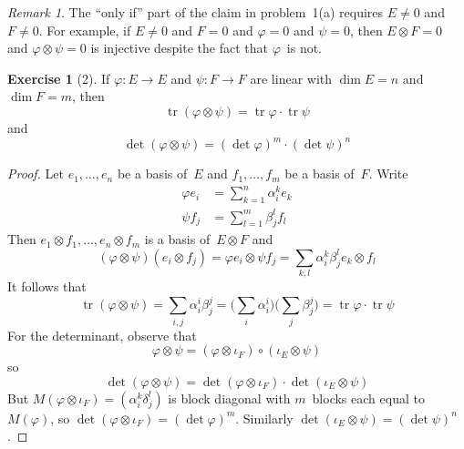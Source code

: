 \documentclass[letterpaper,12pt]{article}
\DeclareMathOperator{\tr}{tr}
\newcommand{\after}{\circ}
\newcommand{\mult}{\cdot}
\newcommand{\tprod}{\otimes}
\theoremstyle{definition}
\newtheorem*{exer}{Exercise}
\theoremstyle{remark}
\newtheorem*{rmk}{Remark}
\begin{document}
\begin{rmk}
The ``only if'' part of the claim in problem~1(a) requires \(E\ne 0\) and \(F\ne 0\). For example, if \(E\ne 0\) and \(F=0\) and \(\varphi=0\) and \(\psi=0\), then \(E\tprod F=0\) and \(\varphi\tprod\psi=0\) is injective despite the fact that \(\varphi\)~is not.
\end{rmk}

\begin{exer}[2]
If \(\varphi:E\to E\) and \(\psi:F\to F\) are linear with \(\dim E=n\) and \(\dim F=m\), then
\[\tr(\varphi\tprod\psi)=\tr\varphi\mult\tr\psi\]
and
\[\det(\varphi\tprod\psi)=(\det\varphi)^m\mult(\det\psi)^n\]
\end{exer}
\begin{proof}
Let \(e_1,\ldots,e_n\) be a basis of~\(E\) and \(f_1,\ldots,f_m\) be a basis of~\(F\). Write
\begin{align*}
\varphi e_i&=\sum_{k=1}^n\alpha^k_ie_k\\
\psi f_j&=\sum_{l=1}^m\beta^l_jf_l
\end{align*}
Then \(e_1\tprod f_1,\ldots,e_n\tprod f_m\) is a basis of~\(E\tprod F\) and
\[(\varphi\tprod\psi)(e_i\tprod f_j)=\varphi e_i\tprod\psi f_j=\sum_{k,l}\alpha^k_i\beta^l_je_k\tprod f_l\]
It follows that
\[\tr(\varphi\tprod\psi)=\sum_{i,j}\alpha^i_i\beta^j_j=\bigl(\sum_i\alpha^i_i\bigr)\bigl(\sum_j\beta^j_j\bigr)=\tr\varphi\mult\tr\psi\]
For the determinant, observe that
\[\varphi\tprod\psi=(\varphi\tprod\iota_F)\after(\iota_E\tprod\psi)\]
so
\[\det(\varphi\tprod\psi)=\det(\varphi\tprod\iota_F)\mult\det(\iota_E\tprod\psi)\]
But \(M(\varphi\tprod\iota_F)=(\alpha^k_i\delta^l_j)\) is block diagonal with \(m\)~blocks each equal to~\(M(\varphi)\), so \(\det(\varphi\tprod\iota_F)=(\det\varphi)^m\). Similarly \(\det(\iota_E\tprod\psi)=(\det\psi)^n\).
\end{proof}
\end{document}
